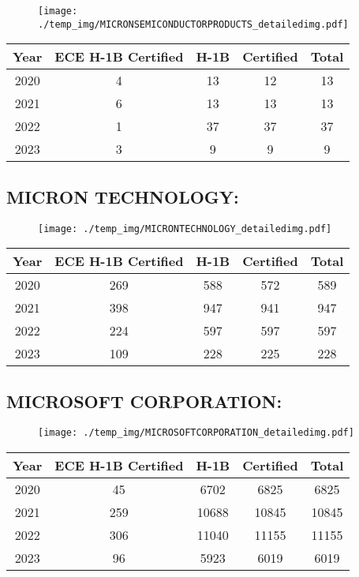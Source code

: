\documentclass{article}%
\begin{document}
\begin{figure}[htbp]%
\centering%
\texttt{[image: ./temp\_img/MICRONSEMICONDUCTORPRODUCTS\_detailedimg.pdf]}%
\end{figure}

%
\begin{longtable}{c|c|c|c|c}%
\hline%
Year&ECE H{-}1B Certified&H{-}1B&Certified&Total\\%
\hline%
2020&4&13&12&13\\%
\hline%
2021&6&13&13&13\\%
\hline%
2022&1&37&37&37\\%
\hline%
2023&3&9&9&9\\%
\hline%
\end{longtable}

%
\newpage%
\subsection{MICRON TECHNOLOGY:}%
\label{subsec:MICRONTECHNOLOGY}%
\label{MICRONTECHNOLOGYdetailed}%


\begin{figure}[htbp]%
\centering%
\texttt{[image: ./temp\_img/MICRONTECHNOLOGY\_detailedimg.pdf]}%
\end{figure}

%
\begin{longtable}{c|c|c|c|c}%
\hline%
Year&ECE H{-}1B Certified&H{-}1B&Certified&Total\\%
\hline%
2020&269&588&572&589\\%
\hline%
2021&398&947&941&947\\%
\hline%
2022&224&597&597&597\\%
\hline%
2023&109&228&225&228\\%
\hline%
\end{longtable}

%
\newpage%
\subsection{MICROSOFT CORPORATION:}%
\label{subsec:MICROSOFTCORPORATION}%
\label{MICROSOFTCORPORATIONdetailed}%


\begin{figure}[htbp]%
\centering%
\texttt{[image: ./temp\_img/MICROSOFTCORPORATION\_detailedimg.pdf]}%
\end{figure}

%
\begin{longtable}{c|c|c|c|c}%
\hline%
Year&ECE H{-}1B Certified&H{-}1B&Certified&Total\\%
\hline%
2020&45&6702&6825&6825\\%
\hline%
2021&259&10688&10845&10845\\%
\hline%
2022&306&11040&11155&11155\\%
\hline%
2023&96&5923&6019&6019\\%
\hline%
\end{longtable}
\end{document}
